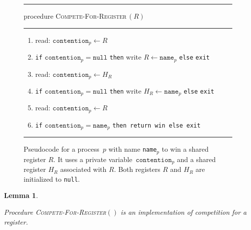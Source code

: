 \documentclass[11pt]{article}
\newcommand{\FF}{\vspace*{\medskipamount}}
\newtheorem{lemma}{Lemma}
\begin{document}
\begin{figure}[t]
\hrule

\FF

\textsf{procedure} \textsc{Compete-For-Register\,$(R)$}

\FF

\hrule

\FF

\begin{enumerate}[nosep]
\item
read: $\texttt{contention}_p\leftarrow R$

\item
\texttt{if} $\texttt{contention}_p = \texttt{null}$ \texttt{then} write $R\leftarrow \texttt{name}_p$ \texttt{else} \texttt{exit}

\item
read: $\texttt{contention}_p\leftarrow H_R$

\item
\texttt{if} $\texttt{contention}_p = \texttt{null}$ \texttt{then} write $H_R\leftarrow    \texttt{name}_p$ \texttt{else} \texttt{exit}

\item
read: $\texttt{contention}_p\leftarrow R$

\item
\texttt{if} $\texttt{contention}_p = \texttt{name}_p$ \texttt{then return win else exit}

\end{enumerate}

\FF

\hrule

\FF

\caption{\label{fig:procedure-competition}
Pseudocode for a process~$p$ with name \texttt{name}$_p$ to win a shared register $R$. 
It uses a private variable~$\texttt{contention}_p$ and a shared register $H_R$ associated with $R$. Both registers $R$ and $H_R$ are initialized to \texttt{null}.}
\end{figure}




\begin{lemma}
\label{lem:compete-for}

Procedure \textsc{Compete-For-Register$()$} is an implementation of competition for a register.
\end{lemma}
\end{document}
